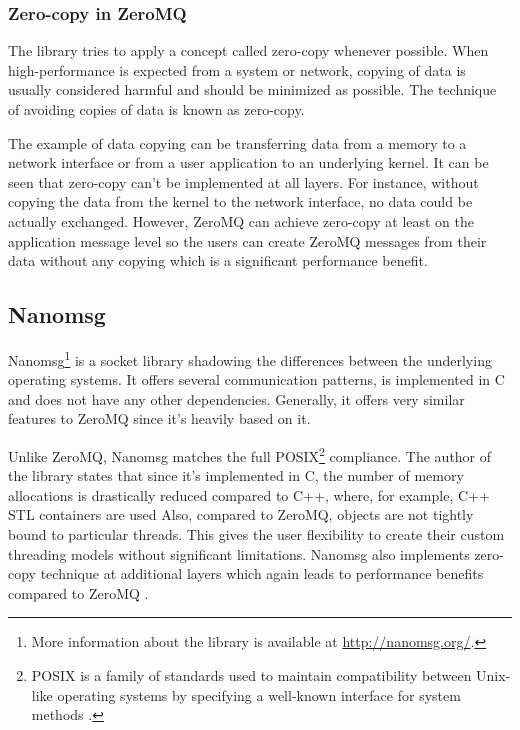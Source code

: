 \subsubsection{Zero-copy in ZeroMQ}
The library tries to apply a concept called zero-copy whenever possible. When high-performance is expected from a system or network, copying of data is usually considered harmful and should be minimized as possible. The technique of avoiding copies of data is known as zero-copy.

The example of data copying can be transferring data from a memory to a network interface or from a user application to an underlying kernel. It can be seen that zero-copy can't be implemented at all layers. For instance, without copying the data from the kernel to the network interface, no data could be actually exchanged. However, ZeroMQ can achieve zero-copy at least on the application message level so the users can create ZeroMQ messages from their data without any copying which is a significant performance benefit.
\subsection{Nanomsg}
\label{nanomsg}
Nanomsg\footnote{More information about the library is available at \url{http://nanomsg.org/}.} is a socket library shadowing the differences between the underlying operating systems. It offers several communication patterns, is implemented in C and does not have any other dependencies. Generally, it offers very similar features to ZeroMQ since it's heavily based on it.

Unlike ZeroMQ, Nanomsg matches the full POSIX\footnote{POSIX is a family of standards used to maintain compatibility between Unix-like operating systems by specifying a well-known interface for system methods \cite{POSIX}. } compliance. The author of the library states that since it's implemented in C, the number of memory allocations is drastically reduced compared to C++, where, for example, C++ STL containers are used  Also, compared to ZeroMQ, objects are not tightly bound to particular threads. This gives the user flexibility to create their custom threading models without significant limitations. Nanomsg also implements zero-copy technique at additional layers which again leads to performance benefits compared to ZeroMQ \cite{Nanomsg_Diff}.


